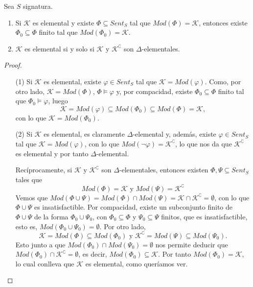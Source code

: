 \begin{prop}\label{finitaxio}
Sea $S$ signatura. \mbox{}
\begin{enumerate}
    \item Si $\mathcal{K}$ es elemental y existe $\Phi \subseteq Sent_S$ tal que $Mod(\Phi) = \mathcal{K}$, entonces existe $\Phi_0 \subseteq \Phi$ finito tal que $Mod(\Phi_0) = \mathcal{K}$.
    \item $\mathcal{K}$ es elemental si y solo si $\mathcal{K}$ y $\mathcal{K}^{\complement}$ son $\Delta$-elementales.
\end{enumerate}
\end{prop}
\begin{proof}\mbox{}
\begin{itemize}
    \item[(1)] Si $\mathcal{K}$ es elemental, existe $\varphi \in Sent_S$ tal que $\mathcal{K} = Mod(\varphi)$. Como, por otro lado, $\mathcal{K} = Mod(\Phi)$, $\Phi \vDash \varphi$ y, por compacidad, existe $\Phi_0 \subseteq \Phi$ finito tal que $\Phi_0 \vDash \varphi$, luego $$\mathcal{K} = Mod(\varphi) \subseteq Mod(\Phi_0) \subseteq Mod(\Phi)= \mathcal{K},$$ con lo que $\mathcal{K} = Mod(\Phi_0)$.
    \item[(2)] Si $\mathcal{K}$ es elemental, es claramente $\Delta$-elemental y, además, existe $\varphi \in Sent_S$ tal que $\mathcal{K} = Mod(\varphi)$, con lo que $Mod(\neg \varphi) = \mathcal{K}^{\complement}$, lo que nos da que $\mathcal{K}^{\complement}$ es elemental y por tanto $\Delta$-elemental. 
    
    Recíprocamente, si $\mathcal{K}$ y $\mathcal{K}^{\complement}$ son $\Delta$-elementales, entonces existen $\Phi, \Psi \subseteq Sent_S$ tales que $$Mod(\Phi) = \mathcal{K} \text{ y } Mod(\Psi) = \mathcal{K}^{\complement}$$
    Vemos que $Mod(\Phi \cup \Psi) = Mod(\Phi) \cap Mod(\Psi) = \mathcal{K} \cap \mathcal{K}^{\complement} = \emptyset$, con lo que $\Phi \cup \Psi$ es insatisfactible. Por compacidad, existe un subconjunto finito de $\Phi \cup \Psi$ de la forma $\Phi_0 \cup \Psi_0$, con $\Phi_0 \subseteq \Phi$ y $\Psi_0 \subseteq \Psi$ finitos, que es insatisfactible, esto es, $Mod(\Phi_0 \cup \Psi_0) = \emptyset$. Por otro lado, 
    $$\mathcal{K} = Mod(\Phi) \subseteq Mod(\Phi_0) \text{ y } \mathcal{K}^{\complement} = Mod(\Psi) \subseteq Mod(\Psi_0).$$
    Esto junto a que $Mod(\Phi_0)\cap Mod(\Psi_0)=\emptyset$ nos permite deducir que $Mod(\Phi_0)\cap\mathcal{K}^{\complement}=\emptyset$, es decir, $Mod(\Phi_0)\subseteq\mathcal{K}$. Por tanto $Mod(\Phi_0)=\mathcal{K}$, lo cual conlleva que $\mathcal{K}$ es elemental, como queríamos ver.
\end{itemize}
\end{proof}

